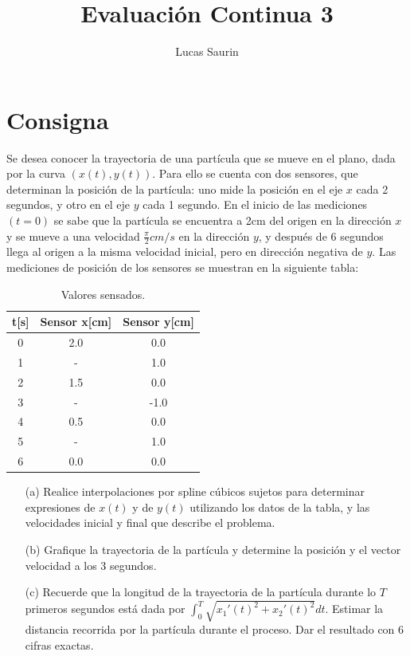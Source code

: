 \documentclass{article}
\title{Evaluación Continua 3}
\author{Lucas Saurin}
\begin{document}
\maketitle

\section{Consigna}
    Se desea conocer la trayectoria de una partícula que se mueve en el plano, dada por la curva \((x(t),y(t))\). Para ello se cuenta con dos sensores, que determinan la posición de la partícula: uno mide la posición en el eje \(x\) cada 2 segundos, y otro en el eje \(y\) cada 1 segundo.
    En el inicio de las mediciones \((t=0)\) se sabe que la partícula se encuentra a 2cm del origen en la dirección \(x\) y se mueve a una velocidad \(\frac{\pi}{2} cm/s\) en la dirección \(y\), y después de 6 segundos llega al origen a la misma velocidad inicial, pero en dirección negativa de \(y\). Las mediciones de posición de los sensores se muestran en la siguiente tabla:
    \begin{table}[h]
        \centering
        \begin{tabular}{|c|c|c|}
            \hline
            t[s] & Sensor x[cm] & Sensor y[cm] \\
            \hline
            0 & 2.0 & 0.0\\
            \hline
            1 & - & 1.0\\
            \hline
            2 & 1.5 & 0.0\\
            \hline
            3 & - & -1.0\\
            \hline
            4 & 0.5 & 0.0\\
            \hline
            5 & - & 1.0\\
            \hline
            6 & 0.0 & 0.0\\
            \hline
        \end{tabular}
        \caption{Valores sensados.}
        \label{Tabla}
    \end{table}

    \begin{enumerate}
        \item [(a)] Realice interpolaciones por spline cúbicos sujetos para determinar expresiones de \(x(t)\) y de \(y(t)\) utilizando los datos de la tabla, y las velocidades inicial y final que describe el problema.
        \item [(b)] Grafique la trayectoria de la partícula y determine la posición y el vector velocidad a los 3 segundos.
        \item [(c)] Recuerde que la longitud de la trayectoria de la partícula durante lo \(T\) primeros segundos está dada por \(\int_{0}^{T} \sqrt{x_1'(t)^2+x_2'(t)^2}dt\). Estimar la distancia recorrida por la partícula durante el proceso. Dar el resultado con 6 cifras exactas.
    \end{enumerate}
\end{document}
